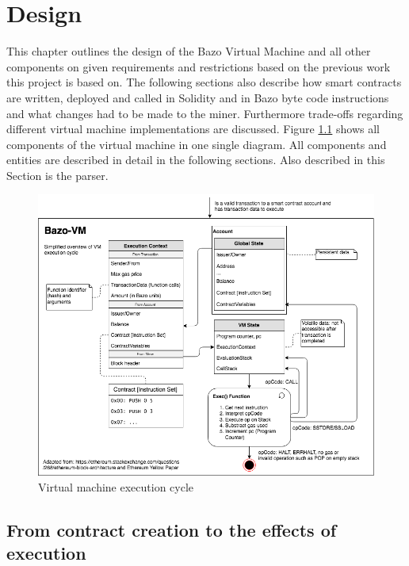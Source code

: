 \chapter{Design} \label{design_chapter}
\thispagestyle{main} %
This chapter outlines the design of the Bazo Virtual Machine and all other components on given requirements and restrictions based on the previous work this project is based on. The following sections also describe how smart contracts are written, deployed and called in Solidity and in Bazo byte code instructions and what changes had to be made to the miner. Furthermore trade-offs regarding different virtual machine implementations are discussed. Figure \ref{vmexecutioncycle} shows all components of the virtual machine in one single diagram. All components and entities are described in detail in the following sections. Also described in this Section is the parser.

\begin{figure}[H]
	\begin{center}
	\includegraphics[width=\textwidth]{./images/execution-cycle}
	\caption{Virtual machine execution cycle}
	\label{vmexecutioncycle}
	\end{center}
\end{figure}

\section{From contract creation to the effects of execution}
